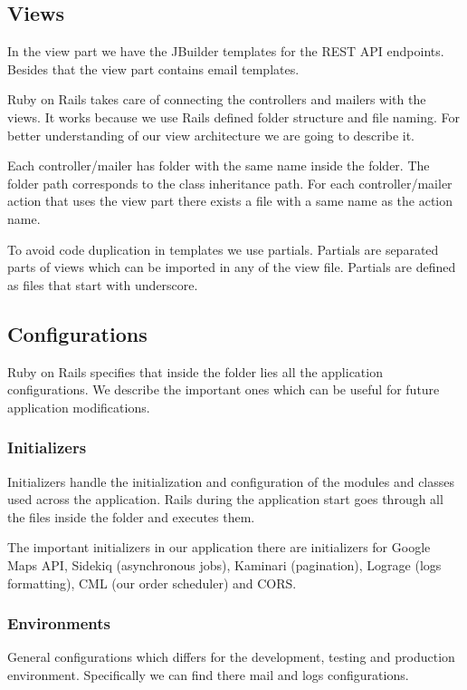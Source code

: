 	\subsection{Views}
		In the view part we have the JBuilder templates for the REST API endpoints. Besides that the view part contains email templates.
		
		Ruby on Rails takes care of connecting the controllers and mailers with the views. It works because we use Rails defined folder structure and file naming. For better understanding of our view architecture we are going to describe it.
		
		Each controller/mailer has folder with the same name inside the  folder. The folder path corresponds to the class inheritance path. For each controller/mailer action that uses the view part there exists a file with a same name as the action name.
		
		To avoid code duplication in templates we use partials. Partials are separated parts of views which can be imported in any of the view file. Partials are defined as files that start with underscore. 

		

		
		
	\subsection{Configurations}
		Ruby on Rails specifies that inside the   folder lies all the application configurations. We describe the important ones which can be useful for future application modifications.
		\subsubsection{Initializers}
			Initializers handle the initialization and configuration of the modules and classes used across the application. Rails during the application start goes through all the files inside the  folder and executes them.
			
			The important initializers in our application there are initializers for Google Maps API, Sidekiq (asynchronous jobs), Kaminari (pagination), Lograge (logs formatting), CML (our order scheduler) and CORS.
			
		\subsubsection{Environments}
			General configurations which differs for the development, testing and production environment. Specifically we can find there mail and logs configurations. 

